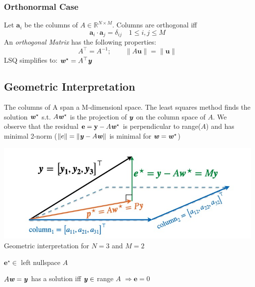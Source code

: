     \subsubsection{Orthonormal Case}
        Let $\mathbf{a}_i$ be the columns of $A \in\mathbb{R}^{N\times M}$. Columns are orthogonal iff \begin{equation*}
            \mathbf{a}_i \cdot \mathbf{a}_j = \delta_{ij} \quad 1 \leq i,j \leq M
        \end{equation*}
        An \textit{orthogonal Matrix} has the following properties:
        \begin{equation*}
            A^\top = A^{-1}; \qquad \|A\mathbf{u}\| = \|\mathbf{u}\|
        \end{equation*}
        LSQ simplifies to:
            $\textbf{\textit{w}}^\star = A^\top\textbf{\textit{y}}$
        
    \subsection{Geometric Interpretation}
        The columns of A span a M-dimensionl space. The least squares method finds the solution $\textbf{\textit{w}}^\star$ s.t. $A\textbf{\textit{w}}^\star$ is the projection of $\textbf{\textit{y}}$ on the column space of $A$.
        We observe that the residual $\mathbf{e} = \mathbf{y}-A\textbf{\textit{w}}^\star$ is perpendicular to  range($A$) and has minimal 2-norm ($\|e\|=\|\textbf{\textit{y}}-A\textbf{\textit{w}}\|$ is minimal for $\textbf{\textit{w}} = \textbf{\textit{w}}^\star$)
        \begin{center}
            \includegraphics[width = 0.7\linewidth]{images/01/geometric_interpretation.jpg}\\
            Geometric interpretation for $N=3$ and $M = 2$
        \end{center}
        
        $\mathbf{e}^\star\in$ left nullspace $A$
        
        $A\textbf{\textit{w}} = \textbf{\textit{y}}$ has a solution iff $\textbf{\textit{y}}\in$ range $A$ $\Rightarrow \mathbf{e} = 0$
